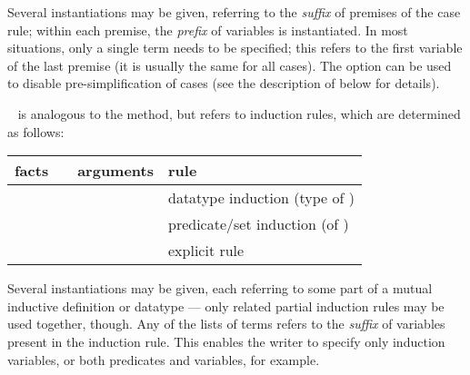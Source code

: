 \begin{isabellebody}
\begin{isamarkuptext}
\begin{description}
  Several instantiations may be given, referring to the \emph{suffix}
  of premises of the case rule; within each premise, the \emph{prefix}
  of variables is instantiated.  In most situations, only a single
  term needs to be specified; this refers to the first variable of the
  last premise (it is usually the same for all cases).  The  option can be used to disable pre-simplification of
  cases (see the description of \hyperlink{method.induct}{\mbox{}} below for details).

  \item \hyperlink{method.induct}{\mbox{}}~ is analogous to the
  \hyperlink{method.cases}{\mbox{}} method, but refers to induction rules, which are
  determined as follows:

  \medskip
  \begin{tabular}{llll}
    facts           &                  & arguments            & rule \\\hline
                    & \hyperlink{method.induct}{\mbox{\isa{induct}}} & \isa{{\isaliteral{22}{\isachardoublequote}}P\ x{\isaliteral{22}{\isachardoublequote}}}        & datatype induction (type of \isa{x}) \\
    \isa{{\isaliteral{22}{\isachardoublequote}}{\isaliteral{5C3C7475726E7374696C653E}{\isasymturnstile}}\ A\ x{\isaliteral{22}{\isachardoublequote}}} & \hyperlink{method.induct}{\mbox{\isa{induct}}} & \isa{{\isaliteral{22}{\isachardoublequote}}{\isaliteral{5C3C646F74733E}{\isasymdots}}{\isaliteral{22}{\isachardoublequote}}}          & predicate/set induction (of \isa{A}) \\
    \isa{{\isaliteral{22}{\isachardoublequote}}{\isaliteral{5C3C646F74733E}{\isasymdots}}{\isaliteral{22}{\isachardoublequote}}}     & \hyperlink{method.induct}{\mbox{\isa{induct}}} & \isa{{\isaliteral{22}{\isachardoublequote}}{\isaliteral{5C3C646F74733E}{\isasymdots}}\ rule{\isaliteral{3A}{\isacharcolon}}\ R{\isaliteral{22}{\isachardoublequote}}} & explicit rule \isa{R} \\
  \end{tabular}
  \medskip
  
  Several instantiations may be given, each referring to some part of
  a mutual inductive definition or datatype --- only related partial
  induction rules may be used together, though.  Any of the lists of
  terms  refers to the \emph{suffix} of variables
  present in the induction rule.  This enables the writer to specify
  only induction variables, or both predicates and variables, for
  example.


\end{description}
\end{isamarkuptext}
\end{isabellebody}
